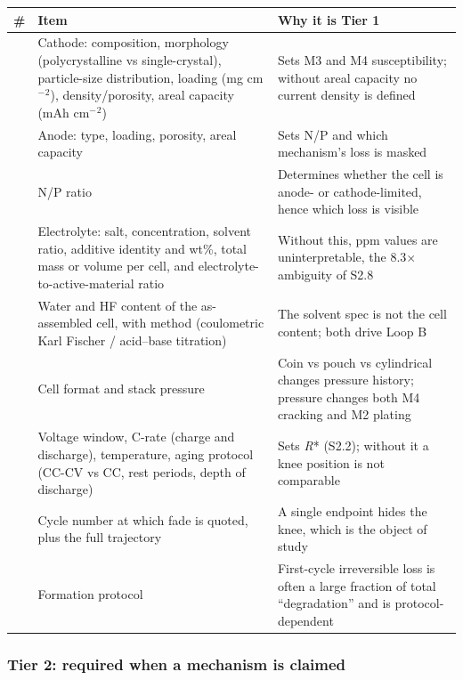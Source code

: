 \documentclass[11pt,a4paper]{article}
\renewcommand{\arraystretch}{1.15}
\begin{document}
\begingroup\small
\setlength{\tabcolsep}{3pt}
\renewcommand{\arraystretch}{1.12}
\sloppy
\begin{tabular}{@{}>{\raggedright\arraybackslash}p{}>{\raggedright\arraybackslash}p{}>{\raggedright\arraybackslash}p{}@{}}
\hline
\textbf{\#} & \textbf{Item} & \textbf{Why it is Tier 1} \\ \hline
1 & Cathode: composition, morphology (polycrystalline vs single-crystal), particle-size distribution, loading (mg cm\ensuremath{^{-}}\ensuremath{^{2}}), density/porosity, areal capacity (mAh cm\ensuremath{^{-}}\ensuremath{^{2}}) & Sets M3 and M4 susceptibility; without areal capacity no current density is defined \\
\hline
2 & Anode: type, loading, porosity, areal capacity & Sets N/P and which mechanism's loss is masked \\
\hline
3 & N/P ratio & Determines whether the cell is anode- or cathode-limited, hence which loss is visible \\
\hline
4 & Electrolyte: salt, concentration, solvent ratio, additive identity and wt\%, total mass or volume per cell, and electrolyte-to-active-material ratio & Without this, ppm values are uninterpretable, the 8.3\ensuremath{\times} ambiguity of S2.8 \\
\hline
5 & Water and HF content of the as-assembled cell, with method (coulometric Karl Fischer / acid--base titration) & The solvent spec is not the cell content; both drive Loop B \\
\hline
6 & Cell format and stack pressure & Coin vs pouch vs cylindrical changes pressure history; pressure changes both M4 cracking and M2 plating \\
\hline
7 & Voltage window, C-rate (charge and discharge), temperature, aging protocol (CC-CV vs CC, rest periods, depth of discharge) & Sets \emph{R}* (S2.2); without it a knee position is not comparable \\
\hline
8 & Cycle number at which fade is quoted, plus the full trajectory & A single endpoint hides the knee, which is the object of study \\
\hline
9 & Formation protocol & First-cycle irreversible loss is often a large fraction of total \textquotedblleft{}degradation\textquotedblright{} and is protocol-dependent \\
\hline
\end{tabular}
\endgroup



\subsubsection*{Tier 2: required when a mechanism is claimed}
\end{document}
